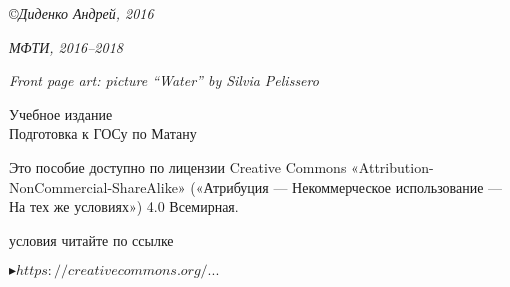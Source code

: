 \medskip
\small
\copyright \textsl{Диденко Андрей, 2016}

\medspace

\textsl{МФТИ, 2016--2018}

\medspace

\textsl{Front page art: picture ``Water'' by Silvia Pelissero }

\vspace*{7\baselineskip}

\center

{\Large Учебное издание}
\\[2\baselineskip]
{\Huge Подготовка к ГОСу по Матану}

\vspace*{\fill}

\noindent
\begin{minipage}[t]{0.61\textwidth}
\quad\small Это пособие доступно по лицензии Creative Commons «Attribution-NonCommercial-ShareAlike» («Атрибуция — Некоммерческое использование — На тех же условиях») 4.0 Всемирная.

 условия читайте по ссылке

\qquad\href{https://creativecommons.org/licenses/by-nc-sa/4.0/deed.ru}{\textcolor{prpl}{$\blacktriangleright https://creativecommons.org/...$}}
\end{minipage}%
\hfill%
\begin{minipage}[t]{\dimexpr(0.4\textwidth-2mm)}
\end{minipage}
